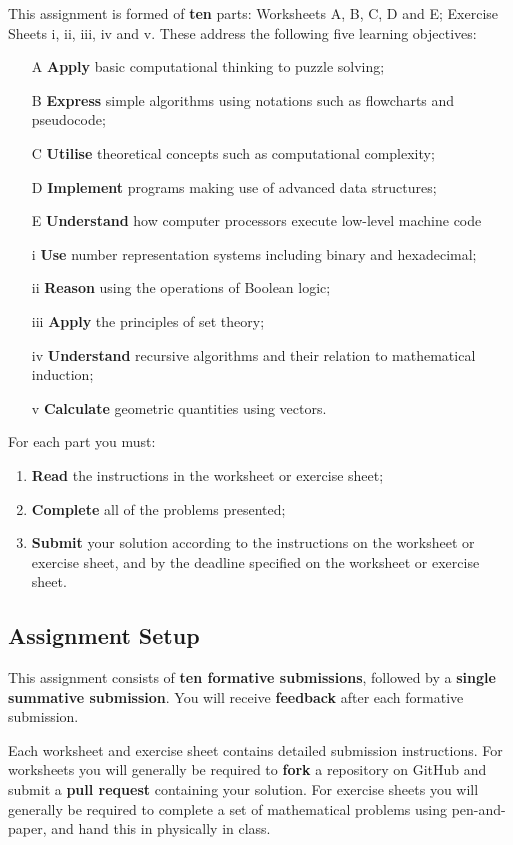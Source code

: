\documentclass{../../fal_assignment}
\begin{document}
This assignment is formed of \textbf{ten} parts: Worksheets A, B, C, D and E; Exercise Sheets i, ii, iii, iv and v.
These address the following five learning objectives:
\begin{enumerate}
	\item[A] \textbf{Apply} basic computational thinking to puzzle solving;
	\item[B] \textbf{Express} simple algorithms using notations such as flowcharts and pseudocode;
	\item[C] \textbf{Utilise} theoretical concepts such as computational complexity;
	\item[D] \textbf{Implement} programs making use of advanced data structures;
	\item[E] \textbf{Understand} how computer processors execute low-level machine code
	\item[i] \textbf{Use} number representation systems including binary and hexadecimal;
	\item[ii] \textbf{Reason} using the operations of Boolean logic;
	\item[iii] \textbf{Apply} the principles of set theory;
	\item[iv] \textbf{Understand} recursive algorithms and their relation to mathematical induction;
	\item[v] \textbf{Calculate} geometric quantities using vectors.
\end{enumerate}

For each part you must:
\begin{enumerate}[label=(\roman*)]
    \item \textbf{Read} the instructions in the worksheet or exercise sheet;
    \item \textbf{Complete} all of the problems presented;
    \item \textbf{Submit} your solution according to the instructions on the worksheet or exercise sheet, and by the deadline specified on the worksheet or exercise sheet.
\end{enumerate}

\subsection*{Assignment Setup} 

This assignment consists of \textbf{ten formative submissions}, followed by a \textbf{single summative submission}.
You will receive \textbf{feedback} after each formative submission.

Each worksheet and exercise sheet contains detailed submission instructions. For worksheets you will generally be required to \textbf{fork} a repository on GitHub and submit a \textbf{pull request} containing your solution. For exercise sheets you will generally be required to complete a set of mathematical problems using pen-and-paper, and hand this in physically in class.
\end{document}
